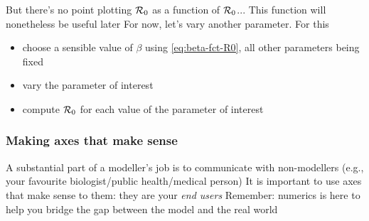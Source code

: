 \documentclass[aspectratio=169]{beamer}\usepackage[]{graphicx}\usepackage[]{xcolor}
\makeatletter
\newcommand{\hlnum}[1]{\textcolor[rgb]{0.686,0.059,0.569}{#1}}%
\newcommand{\hlsng}[1]{\textcolor[rgb]{0.192,0.494,0.8}{#1}}%
\newcommand{\hlcom}[1]{\textcolor[rgb]{0.678,0.584,0.686}{\textit{#1}}}%
\newcommand{\hlopt}[1]{\textcolor[rgb]{0,0,0}{#1}}%
\newcommand{\hldef}[1]{\textcolor[rgb]{0.345,0.345,0.345}{#1}}%
\newcommand{\hlkwa}[1]{\textcolor[rgb]{0.161,0.373,0.58}{\textbf{#1}}}%
\newcommand{\hlkwb}[1]{\textcolor[rgb]{0.69,0.353,0.396}{#1}}%
\newcommand{\hlkwc}[1]{\textcolor[rgb]{0.333,0.667,0.333}{#1}}%
\newcommand{\hlkwd}[1]{\textcolor[rgb]{0.737,0.353,0.396}{\textbf{#1}}}%
\newenvironment{kframe}{%
 \def\at@end@of@kframe{}%
 \ifinner\ifhmode%
  \def\at@end@of@kframe{\end{minipage}}%
  \begin{minipage}{\columnwidth}%
 \fi\fi%
 \def\FrameCommand##1{\hskip\@totalleftmargin \hskip-\fboxsep
 \colorbox{shadecolor}{##1}\hskip-\fboxsep
     \hskip-\linewidth \hskip-\@totalleftmargin \hskip\columnwidth}%
 \MakeFramed {\advance\hsize-\width
   \@totalleftmargin\z@ \linewidth\hsize
   \@setminipage}}%
 {\par\unskip\endMakeFramed%
 \at@end@of@kframe}
\newenvironment{knitrout}{}{} %
\makeatother
\begin{document}
\begin{frame}
But there's no point plotting $\mathcal{R}_0$ as a function of $\mathcal{R}_0$...
\vfill
This function will nonetheless be useful later
\vfill
For now, let's vary another parameter. For this
\begin{itemize}
\item choose a sensible value of $\beta$ using \eqref{eq:beta-fct-R0}, all other parameters being fixed
\item vary the parameter of interest
\item compute $\mathcal{R}_0$ for each value of the parameter of interest
\end{itemize}
\end{frame}




\begin{frame}\frametitle{Making axes that make sense}
A substantial part of a modeller's job is to communicate with non-modellers (e.g., your favourite biologist/public health/medical person)
\vfill
It is important to use axes that make sense to them: they are your \emph{end users}
\vfill
Remember: numerics is here to help you bridge the gap between the model and the real world
\end{frame}
\end{document}

